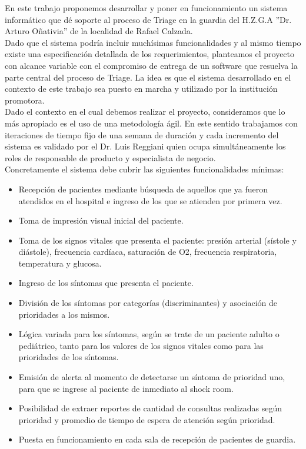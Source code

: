 En este trabajo proponemos desarrollar y poner en funcionamiento un sistema informático que dé soporte al proceso de Triage en la guardia del H.Z.G.A ''Dr. Arturo Oñativia'' de la localidad de Rafael Calzada.\\
Dado que el sistema podría incluir muchísimas funcionalidades y al mismo tiempo existe una especificación detallada de los requerimientos, planteamos el proyecto con alcance variable con el compromiso de entrega de un software que resuelva la parte central del proceso de Triage. La idea es que el sistema desarrollado en el contexto de este trabajo sea puesto en marcha y utilizado por la institución promotora.\\
Dado el contexto en el cual debemos realizar el proyecto, consideramos que lo más apropiado es el uso de una metodología ágil\cite{Shore}. En este sentido trabajamos con iteraciones de tiempo fijo de una semana de duración y cada incremento del sistema es validado por el Dr. Luis Reggiani quien ocupa simultáneamente los roles de responsable de producto y especialista de negocio.\\

Concretamente el sistema debe cubrir las siguientes funcionalidades mínimas:
\begin{itemize}
\item Recepción de pacientes mediante búsqueda de aquellos que ya fueron atendidos en el hospital e ingreso de los que se atienden por primera vez.
\item Toma de impresión visual inicial del paciente.
\item Toma de los signos vitales que presenta el paciente: presión arterial (sístole y diástole), frecuencia cardíaca, saturación de O2, frecuencia respiratoria, temperatura y glucosa.
\item Ingreso de los síntomas que presenta el paciente.
\item División de los síntomas por categorías (discriminantes) y asociación de prioridades a los mismos.
\item Lógica variada para los síntomas, según se trate de un paciente adulto o pediátrico, tanto para los valores de los signos vitales como para las prioridades de los síntomas.
\item Emisión de alerta al momento de detectarse un síntoma de prioridad uno, para que se ingrese al paciente de inmediato al shock room.
\item Posibilidad de extraer reportes de cantidad de consultas realizadas según prioridad y promedio de tiempo de espera de atención según prioridad.
\item Puesta en funcionamiento en cada sala de recepción de pacientes de guardia.
\end{itemize}


